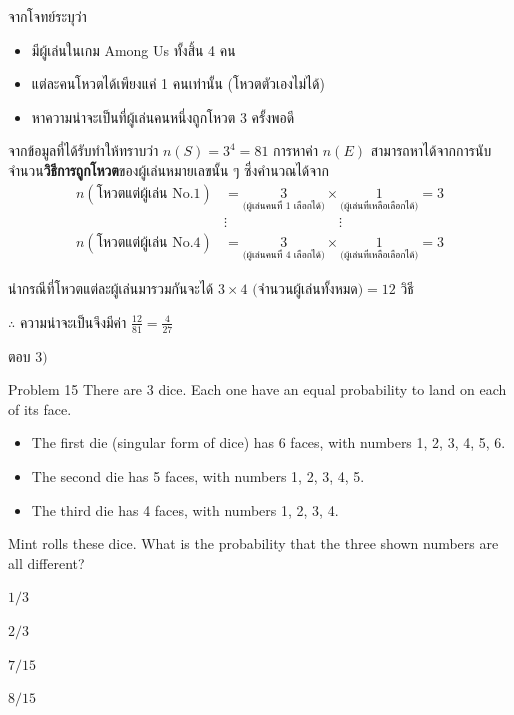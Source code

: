 \documentclass[11pt]{scrartcl}
\begin{document}
\begin{solutionbox}
  จากโจทย์ระบุว่า
  \begin{itemize}
    \item มีผู้เล่นในเกม Among Us ทั้งสิ้น 4 คน
    \item แต่ละคนโหวตได้เพียงแค่ 1 คนเท่านั้น (โหวตตัวเองไม่ได้)
    \item หาความน่าจะเป็นที่ผู้เล่นคนหนึ่งถูกโหวต 3 ครั้งพอดี
  \end{itemize}

  จากข้อมูลที่ได้รับทำให้ทราบว่า $n(S) = 3^4 = 81$ การหาค่า $n(E)$ สามารถหาได้จากการนับจำนวน\textbf{วิธีการถูกโหวต}ของผู้เล่นหมายเลขนั้น ๆ ซึ่งคำนวณได้จาก
  \begin{align*}
    n(\text{โหวตแต่ผู้เล่น No.1}) &=
      \underset{\text{(ผู้เล่นคนที่ 1 เลือกได้)}}{3}
      \times
      \underset{\text{(ผู้เล่นที่เหลือเลือกได้)}}{1}
      = 3 \\
    &\vdots \qquad\qquad\qquad\qquad \vdots \\
    n(\text{โหวตแต่ผู้เล่น No.4}) &=
      \underset{\text{(ผู้เล่นคนที่ 4 เลือกได้)}}{3}
      \times
      \underset{\text{(ผู้เล่นที่เหลือเลือกได้)}}{1}
      = 3
  \end{align*}

  นำกรณีที่โหวตแต่ละผู้เล่นมารวมกันจะได้ $3 \times 4 \text{ (จำนวนผู้เล่นทั้งหมด)} = 12$ วิธี
  
  $\therefore$ ความน่าจะเป็นจึงมีค่า $\frac{12}{81} = \frac{4}{27}$

  ตอบ $\boxed{3)}$
\end{solutionbox}

\begin{problembox}{Problem 15}
There are 3 dice. Each one have an equal probability to land on each of its face.
\begin{itemize}
  \item The first die (singular form of dice) has 6 faces, with numbers 1, 2, 3, 4, 5, 6.
  \item The second die has 5 faces, with numbers 1, 2, 3, 4, 5.
  \item The third die has 4 faces, with numbers 1, 2, 3, 4.
\end{itemize}
Mint rolls these dice. What is the probability that the three shown numbers are all different?
 
\begin{choices}
\item $1/3$
\item $2/3$
\item $7/15$
\item $8/15$
\end{choices}
\end{problembox}
\end{document}
